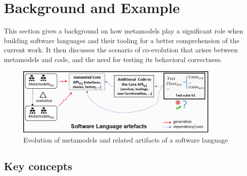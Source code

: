 

\section{Background and Example}
\label{sec_background}




This section gives a background on how metamodels play a significant role when building software languages and their tooling for a better comprehension of the current work. It then discusses the scenario of co-evolution that arises between metamodels and code, and the need for testing its behavioral correctness. 

\begin{figure}[tb]
	\centering
	\includegraphics[width=0.9\textwidth]{./pics/chapter2pics/background.png}
	\caption{Evolution of metamodels and related artifacts of a software language}
	\label{fig:SL_useage}
\end{figure}


\subsection{Key concepts}

